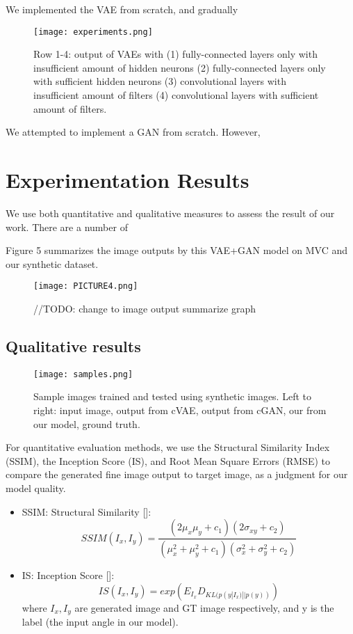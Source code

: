 \documentclass[10pt,conference]{IEEEtran}
\begin{document}
We implemented the VAE from scratch, and gradually 

\begin{figure}[htbp]
\centering
\texttt{[image: experiments.png]}
\caption{Row 1-4: output of VAEs with (1) fully-connected layers only with insufficient amount of  hidden neurons (2) fully-connected layers only with sufficient hidden neurons (3) convolutional layers with insufficient amount of filters (4) convolutional layers with sufficient amount of filters. }
\end{figure}

We attempted to implement a GAN from scratch. However, 

\section{Experimentation Results}

We use both quantitative and qualitative measures to assess the result of our work. 
There are a number of 

Figure 5 summarizes the image outputs by this VAE+GAN model on MVC and our synthetic dataset.

\begin{figure*}[htbp]
\centering
\texttt{[image: PICTURE4.png]}
\caption{//TODO: change to image output summarize graph}
\end{figure*}

\subsection{Qualitative results}

\begin{figure*}[htbp]
\centering
\texttt{[image: samples.png]}
\caption{Sample images trained and tested using synthetic images. Left to right: input image, output from cVAE, output from cGAN, our from our model, ground truth.}
\end{figure*}

For quantitative evaluation methods, we use the Structural Similarity Index (SSIM), the Inception Score (IS), and Root Mean Square Errors (RMSE) to compare the generated fine image output to target image, as a judgment for our model quality.

\begin{itemize}
\item SSIM: Structural Similarity []:
$$SSIM(I_x,I_y)=\frac{(2\mu_x \mu_y + c_1)(2\sigma_{xy}+c_2)}{(\mu_x^2+\mu_y^2 +c_1)(\sigma_x^2+\sigma_y^2+c_2)}$$

\item IS: Inception Score []:
$$IS(I_x,I_y)=exp(E_{I_x}D_{KL(p(y|I_x)||p(y))})$$
where $I_x,I_y$ are generated image and GT image respectively, and y is the label (the input angle in our model).

\end{itemize}
\end{document}
